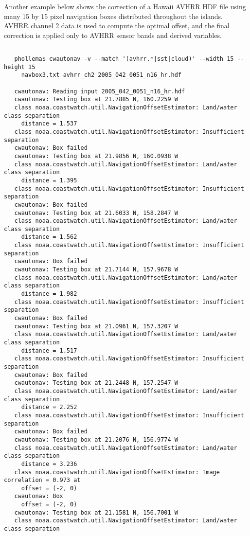  Another example below shows the correction of a Hawaii AVHRR HDF file using many 15 by 15 pixel navigation boxes distributed throughout the islands. AVHRR channel 2 data is used to compute the optimal offset, and the final correction is applied only to AVHRR sensor bands and derived variables.
\begin{verbatim}

   phollema$ cwautonav -v --match '(avhrr.*|sst|cloud)' --width 15 --height 15
     navbox3.txt avhrr_ch2 2005_042_0051_n16_hr.hdf

   cwautonav: Reading input 2005_042_0051_n16_hr.hdf
   cwautonav: Testing box at 21.7885 N, 160.2259 W
   class noaa.coastwatch.util.NavigationOffsetEstimator: Land/water class separation 
     distance = 1.537
   class noaa.coastwatch.util.NavigationOffsetEstimator: Insufficient separation
   cwautonav: Box failed
   cwautonav: Testing box at 21.9856 N, 160.0938 W
   class noaa.coastwatch.util.NavigationOffsetEstimator: Land/water class separation 
     distance = 1.395
   class noaa.coastwatch.util.NavigationOffsetEstimator: Insufficient separation
   cwautonav: Box failed
   cwautonav: Testing box at 21.6033 N, 158.2847 W
   class noaa.coastwatch.util.NavigationOffsetEstimator: Land/water class separation 
     distance = 1.562
   class noaa.coastwatch.util.NavigationOffsetEstimator: Insufficient separation
   cwautonav: Box failed
   cwautonav: Testing box at 21.7144 N, 157.9678 W
   class noaa.coastwatch.util.NavigationOffsetEstimator: Land/water class separation 
     distance = 1.982
   class noaa.coastwatch.util.NavigationOffsetEstimator: Insufficient separation
   cwautonav: Box failed
   cwautonav: Testing box at 21.0961 N, 157.3207 W
   class noaa.coastwatch.util.NavigationOffsetEstimator: Land/water class separation 
     distance = 1.517
   class noaa.coastwatch.util.NavigationOffsetEstimator: Insufficient separation
   cwautonav: Box failed
   cwautonav: Testing box at 21.2448 N, 157.2547 W
   class noaa.coastwatch.util.NavigationOffsetEstimator: Land/water class separation 
     distance = 2.252
   class noaa.coastwatch.util.NavigationOffsetEstimator: Insufficient separation
   cwautonav: Box failed
   cwautonav: Testing box at 21.2076 N, 156.9774 W
   class noaa.coastwatch.util.NavigationOffsetEstimator: Land/water class separation 
     distance = 3.236
   class noaa.coastwatch.util.NavigationOffsetEstimator: Image correlation = 0.973 at 
     offset = (-2, 0)
   cwautonav: Box 
     offset = (-2, 0)
   cwautonav: Testing box at 21.1581 N, 156.7001 W
   class noaa.coastwatch.util.NavigationOffsetEstimator: Land/water class separation 

\end{verbatim}

